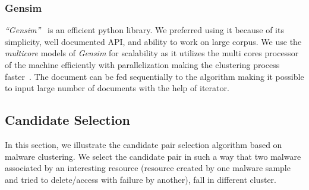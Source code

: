 \subsubsection{Gensim}
\label{ssub:Gensim}
\emph{``Gensim''}~\cite[]{gensim} is an efficient python library.
We preferred using it because of its simplicity, well documented API, and ability to work on large corpus.
We use the \emph{multicore} models of \emph{Gensim} for scalability as it utilizes the multi cores processor of the machine efficiently with parallelization making the clustering process faster~\cite[]{ldamulticore}.
The document can be fed sequentially to the algorithm making it possible to input large number of documents with the help of iterator.

\subsection{Candidate Selection}
\label{sub:Candidate Selection}
In this section, we illustrate the candidate pair selection algorithm based on malware clustering.
We select the candidate pair in such a way that two malware associated by an interesting resource (resource created by one malware sample and tried to delete/access with failure by another), fall in different cluster.

